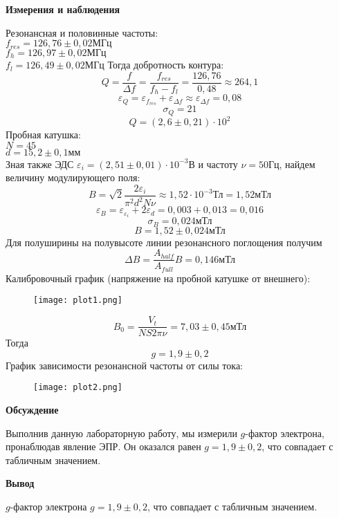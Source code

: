 \documentclass[12pt]{article}
\begin{document}
\begin{center}
    \textbf{Измерения и наблюдения}
\end{center}
Резонансная и половинные частоты:
\\
$f_{res}= 126,76 \pm 0,02\text{МГц}$
\\
$f_h= 126,97 \pm 0,02\text{МГц}$
\\
$f_l= 126,49 \pm 0,02 \text{МГц}$
Тогда добротность контура:
$$Q= \frac{f}{\Delta f} = \frac{f_{res}}{f_h - f_l} = \frac{126,76}{0,48} \approx
264,1$$
$$\varepsilon_Q = \varepsilon_{f_{res}} + \varepsilon_{\Delta f} \approx
\varepsilon_{\Delta f} = 0,08$$
$$\sigma_Q = 21$$
$$Q = (2,6 \pm 0,21) \cdot 10^2$$
Пробная катушка:
\\
$N = 45$
\\
$d = 15,2 \pm 0,1 \text{мм}$
\\
Зная также ЭДС $\varepsilon_i = (2,51 \pm 0,01) \cdot 10^{-3}\text{В}$ и частоту $\nu = 50
\text{Гц}$, найдем величину модулирующего поля:
$$B=\sqrt{2} \frac{2 \varepsilon_i}{\pi^2d^2N\nu} \approx 1,52 \cdot 10^{-3}
\text{Тл} = 1,52 \text{мТл}$$
$$\varepsilon_B = \varepsilon_{\varepsilon_i} + 2\varepsilon_d = 0,003 + 0,013
= 0,016$$
$$\sigma_B = 0,024 \text{мТл}$$
$$B = 1,52 \pm 0,024 \text{мТл}$$
Для полуширины на полувысоте линии резонансного поглощения получим
$$\Delta B= \frac{A_{half}}{A_{full}} B = 0,146 \text{мТл}$$
Калибровочный график (напряжение на пробной катушке от внешнего):
\begin{figure}[ht]
    \centering
    \texttt{[image: plot1.png]}
    \label{fig:plot1}
\end{figure}
$$B_0=\frac{V_t}{NS 2 \pi \nu} = 7,03 \pm 0,45 \text{мТл}$$
Тогда
$$g = 1,9 \pm 0,2$$
График зависимости резонансной частоты от силы тока:
\begin{figure}[ht!]
    \centering
    \texttt{[image: plot2.png]}
    \label{fig:plot2}
\end{figure}
\newpage
\begin{center}
    \textbf{Обсуждение}
\end{center}
Выполнив данную лабораторную работу, мы измерили $g$-фактор электрона,
пронаблюдав явление ЭПР. Он оказался равен $g = 1,9 \pm 0,2$, что совпадает с
табличным значением.
\begin{center}
    \textbf{Вывод}
\end{center}
$g$-фактор электрона $g = 1,9 \pm 0,2$, что совпадает с табличным значением.
\end{document}
